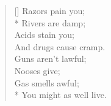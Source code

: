 \documentclass[MAIN]{subfiles}
\begin{document}
\settowidth{\versewidth}{You might as well live.}
\begin{verse}[\versewidth]
Razors pain you;\\*
\vin Rivers are damp;\\
Acids stain you;\\
\vin And drugs cause cramp.\\
Guns aren't lawful;\\
\vin Nooses give;\\
Gas smells awful;\\*
\vin You might as well live.
\end{verse}
\end{document}

